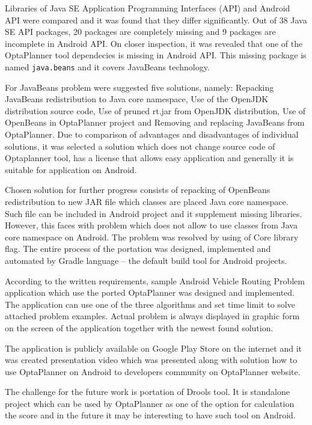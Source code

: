 Libraries of Java SE Application Programming Interfaces (API) and Android API were compared and it was found that they
differ significantly. Out of 38 Java SE API packages, 20 packages are completely missing and 9 packages are incomplete
in Android API. On closer inspection, it was revealed that one of the OptaPlanner tool dependecies is missing in
Android API. This missing package is named \texttt{java.beans} and it covers JavaBeans technology.

For JavaBeans problem were suggested five solutions, namely: Repacking JavaBeans redistribution to Java core namespace,
Use of the OpenJDK distribution source code, Use of pruned rt.jar from OpenJDK distribution, Use of OpenBeans in
OptaPlanner project and Removing and replacing JavaBeans from OptaPlanner. Due to comparison of advantages and
disadvantages of individual solutions, it was selected a solution which does not change source code of Optaplanner tool,
has a license that allows easy application and generally it is suitable for application on Android.

Chosen solution for further progress consists of repacking of OpenBeans redistribution to new JAR file which classes
are placed Java core namespace. Such file can be included in Android project and it supplement missing libraries.
However, this faces with problem which does not allow to use classes from Java core namespace on Android. The problem
was resolved by using of Core library flag. The entire process of the portation was designed, implemented and
automated by Gradle language -- the default build tool for Android projects.

According to the written requirements, sample Android Vehicle Routing Problem application which use the ported
OptaPlanner was designed and implemented. The application can use one of the three algorithms and set time limit to
solve attached problem examples. Actual problem is always displayed in graphic form on the screen of the application
together with the newest found solution.

The application is publicly available on Google Play Store on the internet and it was created presentation video which
was presented along with solution how to use OptaPlanner on Android to developers community on OptaPlanner website.

The challenge for the future work is portation of Drools tool. It is standalone project which can be used by OptaPlanner
as one of the option for calculation the score and in the future it may be interesting to have such tool on Android.
